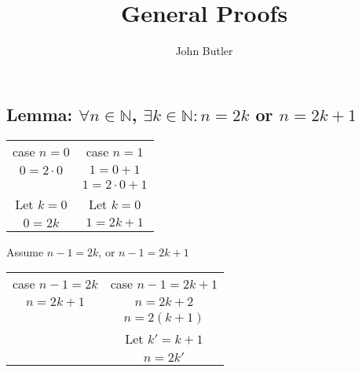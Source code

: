 \documentclass[11pt, oneside]{article}   	%
\title{General Proofs}
\author{John Butler}
\date{}							%
\begin{document}
\maketitle

\tableofcontents

\subsection{Lemma: $\forall n \in \mathbb{N}$, $\exists k \in \mathbb{N}: n = 2k$ or $n =2k + 1$}
		\begin{center}
		\begin{tabular}{c|c}
			case $n = 0$&case $n = 1$\\
			$0 = 2\cdot 0$&$1 = 0 + 1$\\
			&$1 = 2\cdot 0 + 1$\\
			Let $k  =0$& Let $k = 0$\\
			$0 = 2k$&$1 = 2k + 1$
		\end{tabular}
		\end{center}
			Assume $n - 1 = 2k$, or $n - 1 = 2k + 1$\\
		\begin{center}
		\begin{tabular}{c|c}
			case $n - 1 = 2k$&case $n - 1 = 2k + 1$\\
			$n = 2k + 1$&$n = 2k + 2$\\
			&$n = 2(k + 1)$\\
			&Let $k' = k + 1$\\
			&$n = 2k'$
		\end{tabular}
		\end{center}
\end{document}
